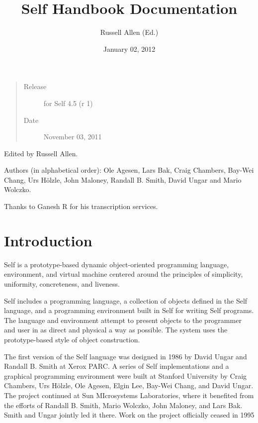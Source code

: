 \documentclass[letterpaper,10pt,english]{sphinxmanual}
\title{Self Handbook Documentation}
\date{January 02, 2012}
\author{Russell Allen (Ed.)}
\begin{document}
\maketitle
\tableofcontents
{}\label{index::doc}

\begin{quote}\begin{description}
\item[{Release}] \leavevmode
for Self 4.5 (r 1)

\item[{Date}] \leavevmode
November 03, 2011

\end{description}\end{quote}

Edited by Russell Allen.

Authors (in alphabetical order): Ole Agesen, Lars Bak, Craig Chambers, Bay-Wei Chang, Urs Hölzle, John Maloney, Randall B. Smith, David Ungar and Mario Wolczko.

Thanks to Ganesh R for his transcription services.


\chapter{Introduction}
\label{intro:introduction}\label{intro::doc}\label{intro:the-self-handbook}
Self is a prototype-based dynamic object-oriented programming language, environment, and virtual machine centered around the principles of simplicity, uniformity, concreteness, and liveness.

Self includes a programming language, a collection of objects defined in the Self language, and a programming environment built in Self for writing Self programs. The language and environment attempt to present objects to the programmer and user in as direct and physical a way as possible. The system uses the prototype-based style of object construction.

The first version of the Self language was designed in 1986 by David Ungar and Randall B. Smith at Xerox PARC. A series of Self implementations and a graphical programming environment were built at Stanford University by Craig Chambers, Urs Hölzle, Ole Agesen, Elgin Lee, Bay-Wei Chang, and David Ungar. The project continued at Sun MIcrosystems Laboratories, where it benefited from the efforts of Randall B. Smith, Mario Wolczko, John Maloney, and Lars Bak. Smith and Ungar jointly led it there. Work on the project officially ceased in 1995
\end{document}
